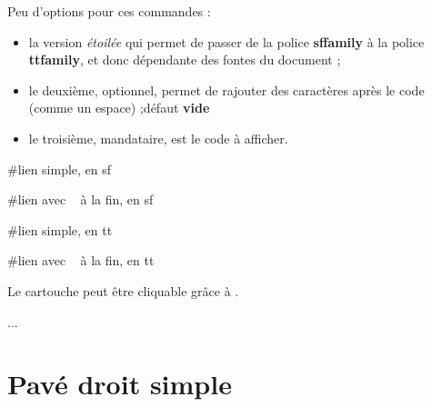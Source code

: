 \documentclass{article}
\newcommand\ctex[1]{\tcbox[vignettelatex]{#1}}
\newcommand\Cle[1]{{\bfseries\sffamily\textlangle #1\textrangle}}
\begin{document}
\begin{codecles}
Peu d'options pour ces commandes :

\begin{itemize}
	\item la version \textit{étoilée} qui permet de  passer de la police \Cle{sffamily} à la police \Cle{ttfamily}, et donc dépendante des fontes du document ;
	\item le deuxième, optionnel, permet de rajouter des caractères après le code (comme un \textsf{espace}) ;\hfill{}défaut \Cle{vide}
	\item le troisième, mandataire, est le \textsf{code} à afficher.
\end{itemize}
\end{codecles}

\begin{codetex}
           #lien simple, en sf

        #lien avec ~ à la fin, en sf

          #lien simple, en tt

       #lien avec ~ à la fin, en tt
\end{codetex}

\begin{codesortie}



\end{codesortie}

\begin{codeinfo}
Le \textsf{cartouche} peut être \og cliquable \fg{} grâce à \ctex{href}.
\end{codeinfo}

\begin{codetex}
\usepackage{hyperref}
...
\href{https://capytale2.ac-paris.fr/web/c/abcd-12345}{}
\end{codetex}

\begin{codesortie}
\href{https://capytale2.ac-paris.fr/web/c/abcd-12345}{}
\end{codesortie}

\newpage

\section{Pavé droit \og simple \fg{}}
\end{document}
